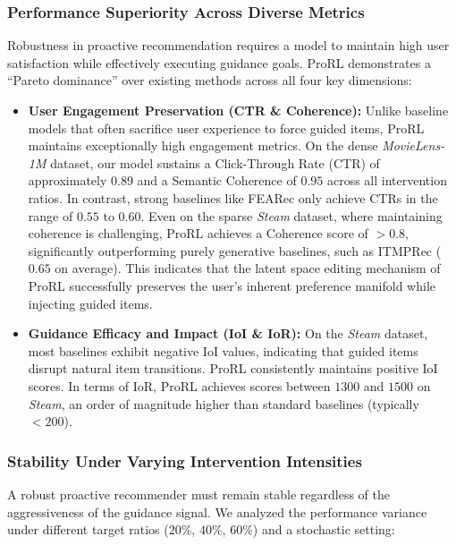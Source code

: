 \documentclass{llmxive}
\begin{document}
\subsubsection{Performance Superiority Across Diverse Metrics}
Robustness in proactive recommendation requires a model to maintain high user satisfaction while effectively executing guidance goals. ProRL demonstrates a ``Pareto dominance'' over existing methods across all four key dimensions:

\begin{itemize}
    \item \textbf{User Engagement Preservation (CTR \& Coherence):} 
    Unlike baseline models that often sacrifice user experience to force guided items, ProRL maintains exceptionally high engagement metrics.
    On the dense \textit{MovieLens-1M} dataset, our model sustains a Click-Through Rate (CTR) of approximately $0.89$ and a Semantic Coherence of $0.95$ across all intervention ratios. In contrast, strong baselines like FEARec only achieve CTRs in the range of $ 0.55$ to $0.60$. 
    Even on the sparse \textit{Steam} dataset, where maintaining coherence is challenging, ProRL achieves a Coherence score of $>0.8$, significantly outperforming purely generative baselines, such as ITMPRec ($0.65$ on average). This indicates that the latent space editing mechanism of ProRL successfully preserves the user's inherent preference manifold while injecting guided items.

    \item \textbf{Guidance Efficacy and Impact (IoI \& IoR):} 
    On the \textit{Steam} dataset, most baselines exhibit negative IoI values, indicating that guided items disrupt natural item transitions. ProRL consistently maintains positive IoI scores. In terms of IoR, ProRL achieves scores between $1300$ and $1500$ on \textit{Steam}, an order of magnitude higher than standard baselines (typically $<200$).
\end{itemize}

\subsubsection{Stability Under Varying Intervention Intensities}
A robust proactive recommender must remain stable regardless of the aggressiveness of the guidance signal. We analyzed the performance variance under different target ratios ($20\%$, $40\%$, $60\%$) and a stochastic setting:
\end{document}
